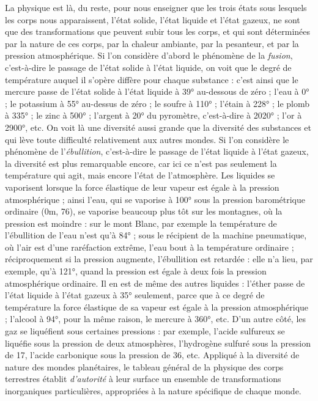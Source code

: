 \documentclass[a4paper, 11pt, oneside, landscape]{article}
\begin{document}
La physique est là, du reste, pour nous enseigner que les trois états sous lesquels les corps nous apparaissent, l'état solide, l'état liquide et l'état gazeux, ne sont que des transformations que peuvent subir tous les corps, et qui sont déterminées par la nature de ces corps, par la chaleur ambiante, par la pesanteur, et par la pression atmosphérique. Si l'on considère d'abord le phénomène de la \emph{fusion}, c'est-à-dire le passage de l'état solide à l'état liquide, on voit que le degré de température auquel il s'opère diffère pour chaque substance : c'est ainsi que le mercure passe de l'état solide à l'état liquide à 39° au-dessous de zéro ; l'eau à 0° ; le potassium à 55° au-dessus de zéro ; le soufre à 110° ; l'étain à 228° ; le plomb à 335° ; le zinc à 500° ; l'argent à 20° du pyromètre, c'est-à-dire à 2020° ; l'or à 2900°, etc. On voit là une diversité aussi grande que la diversité des substances et qui lève toute difficulté relativement aux autres mondes. Si l'on considère le phénomène de l'\emph{ébullition}, c'est-à-dire le passage de l'état liquide à l'état gazeux, la diversité est plus remarquable encore, car ici ce n'est pas seulement la température qui agit, mais encore l'état de l'atmosphère. Les liquides se vaporisent lorsque la force élastique de leur vapeur est égale à la pression atmosphérique ; ainsi l'eau, qui se vaporise à 100° sous la pression barométrique ordinaire (0m, 76), se vaporise beaucoup plus tôt sur les montagnes, où la pression est moindre : sur le mont Blanc, par exemple la température de l'ébullition de l'eau n'est qu'à 84° ; sous le récipient de la machine pneumatique, où l'air est d'une raréfaction extrême, l'eau bout à la température ordinaire ; réciproquement si la pression augmente, l'ébullition est retardée : elle n'a lieu, par exemple, qu'à 121°, quand la pression est égale à deux fois la pression atmosphérique ordinaire. Il en est de même des autres liquides : l'éther passe de l'état liquide à l'état gazeux à 35° seulement, parce que à ce degré de température la force élastique de sa vapeur est égale à la pression atmosphérique ; l'alcool à 94°, pour la même raison, le mercure à 360°, etc. D'un autre côté, les gaz se liquéfient sous certaines pressions : par exemple, l'acide sulfureux se liquéfie sous la pression de deux atmosphères, l'hydrogène sulfuré sous la pression de 17, l'acide carbonique sous la pression de 36, etc. Appliqué à la diversité de nature des mondes planétaires, le tableau général de la physique des corps terrestres établit \emph{d'autorité} à leur surface un ensemble de transformations inorganiques particulières, appropriées à la nature spécifique de chaque monde.
\end{document}

